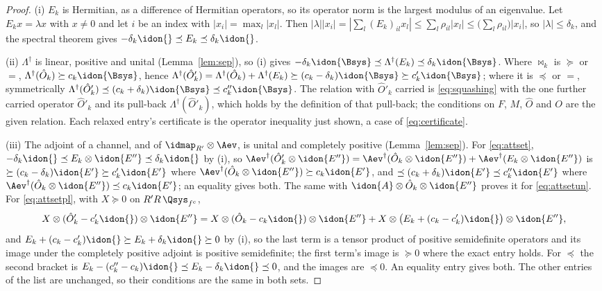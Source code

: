 \begin{proof}
(i) $E_k$ is Hermitian, as a difference of Hermitian operators, so its
operator norm is the largest modulus of an eigenvalue. Let $E_kx=\lambda x$
with $x\neq0$ and let $i$ be an index with $|x_i|=\max_l|x_l|$. Then
$|\lambda||x_i|=|\sum_l(E_k)_{il}x_l|\le\sum_l\rho_{il}|x_l|
\le\big(\sum_l\rho_{il}\big)|x_i|$, so $|\lambda|\le\delta_k$, and the
spectral theorem gives $-\delta_k\idon{}\preceq E_k\preceq\delta_k\idon{}$.

(ii) $\Lambda^{\dagger}$ is linear, positive and unital (Lemma~\ref{lem:sep}),
so (i) gives $-\delta_k\idon{\Bsys}\preceq\Lambda^{\dagger}(E_k)\preceq
\delta_k\idon{\Bsys}$. Where $\bowtie_k$ is $\succeq$ or $=$,
$\Lambda^{\dagger}(\hat O_k)\succeq c_k\idon{\Bsys}$, hence
$\Lambda^{\dagger}(\hat O'_k)=\Lambda^{\dagger}(\hat O_k)+
\Lambda^{\dagger}(E_k)\succeq(c_k-\delta_k)\idon{\Bsys}\succeq c'_k
\idon{\Bsys}$; where it is $\preceq$ or $=$, symmetrically
$\Lambda^{\dagger}(\hat O'_k)\preceq(c_k+\delta_k)\idon{\Bsys}\preceq
c''_k\idon{\Bsys}$. The relation with $\hat O'_k$ carried is
\eqref{eq:squashing} with the one further carried operator $\hat O'_k$ and
its pull-back $\Lambda^{\dagger}(\hat O'_k)$, which holds by the definition
of that pull-back; the conditions on $F$, $M$, $\hat O$ and $O$ are the given
relation. Each relaxed entry's certificate is the operator inequality just
shown, a case of \eqref{eq:certificate}.

(iii) The adjoint of a channel, and of $\idmap_{R'}\otimes\Aev$, is unital and
completely positive (Lemma~\ref{lem:sep}). For \eqref{eq:attset},
$-\delta_k\idon{}\preceq E_k\otimes\idon{E''}\preceq\delta_k\idon{}$ by (i),
so $\Aev^{\dagger}(\hat O'_k\otimes\idon{E''})=\Aev^{\dagger}(\hat O_k\otimes
\idon{E''})+\Aev^{\dagger}(E_k\otimes\idon{E''})$ is $\succeq(c_k-\delta_k)
\idon{E'}\succeq c'_k\idon{E'}$ where $\Aev^{\dagger}(\hat O_k\otimes
\idon{E''})\succeq c_k\idon{E'}$, and $\preceq(c_k+\delta_k)\idon{E'}\preceq
c''_k\idon{E'}$ where $\Aev^{\dagger}(\hat O_k\otimes\idon{E''})\preceq
c_k\idon{E'}$; an equality gives both. The same with
$\idon{A}\otimes\hat O_k\otimes\idon{E''}$ proves it for \eqref{eq:attsetun}.
For \eqref{eq:attsetpl}, with $X\succeq0$ on $R'R\,\Qsys_{f^c}$,
\begin{equation*}
  X\otimes(\hat O'_k-c'_k\idon{})\otimes\idon{E''}
  =X\otimes(\hat O_k-c_k\idon{})\otimes\idon{E''}
  +X\otimes\big(E_k+(c_k-c'_k)\idon{}\big)\otimes\idon{E''},
\end{equation*}
and $E_k+(c_k-c'_k)\idon{}\succeq E_k+\delta_k\idon{}\succeq0$ by (i), so
the last term is a tensor product of positive semidefinite operators and its
image under the completely positive adjoint is positive semidefinite; the
first term's image is $\succeq0$ where the exact entry holds. For
$\preceq$ the second bracket is $E_k-(c''_k-c_k)\idon{}\preceq
E_k-\delta_k\idon{}\preceq0$, and the images are $\preceq0$. An equality
entry gives both. The other entries of the list are unchanged, so their
conditions are the same in both sets.


\end{proof}
